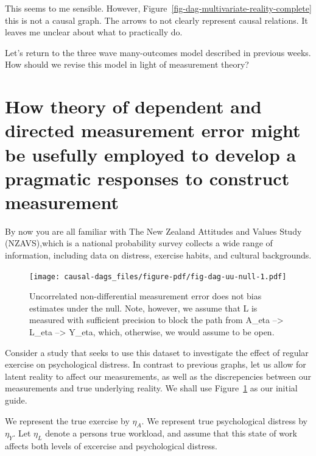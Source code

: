 \documentclass[
  singlecolumn]{report}
\begin{document}
This seems to me sensible. However,
Figure~\ref{fig-dag-multivariate-reality-complete} this is not a causal
graph. The arrows to not clearly represent causal relations. It leaves
me unclear about what to practically do.

Let's return to the three wave many-outcomes model described in previous
weeks. How should we revise this model in light of measurement theory?

\hypertarget{how-theory-of-dependent-and-directed-measurement-error-might-be-usefully-employed-to-develop-a-pragmatic-responses-to-construct-measurement}{%
\section{How theory of dependent and directed measurement error might be
usefully employed to develop a pragmatic responses to construct
measurement}\label{how-theory-of-dependent-and-directed-measurement-error-might-be-usefully-employed-to-develop-a-pragmatic-responses-to-construct-measurement}}

By now you are all familiar with The New Zealand Attitudes and Values
Study (NZAVS),which is a national probability survey collects a wide
range of information, including data on distress, exercise habits, and
cultural backgrounds.

\begin{figure}

{\centering \texttt{[image: causal-dags\_files/figure-pdf/fig-dag-uu-null-1.pdf]}

}

\caption{\label{fig-dag-uu-null}Uncorrelated non-differential
measurement error does not bias estimates under the null. Note, however,
we assume that L is measured with sufficient precision to block the path
from A\_eta --\textgreater{} L\_eta --\textgreater{} Y\_eta, which,
otherwise, we would assume to be open.}

\end{figure}

Consider a study that seeks to use this dataset to investigate the
effect of regular exercise on psychological distress. In contrast to
previous graphs, let us allow for latent reality to affect our
measurements, as well as the discrepencies between our measurements and
true underlying reality. We shall use Figure~\ref{fig-dag-uu-null} as
our initial guide.

We represent the true exercise by \(\eta_A\). We represent true
psychological distress by \(\eta_Y\). Let \(\eta_L\) denote a persons
true workload, and assume that this state of work affects both levels of
excercise and psychological distress.
\end{document}
